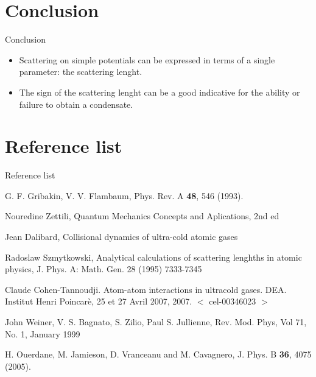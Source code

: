 \section{Conclusion}
\begin{frame}[allowframebreaks]{Conclusion}

\begin{itemize}
\item Scattering on simple potentials can be expressed in terms of a single parameter: the scattering lenght.
\item The sign of the scattering lenght can be a good indicative for the ability or failure to obtain a condensate. 
\end{itemize}

\end{frame}

\section{Reference list}
\begin{frame}[allowframebreaks]{Reference list}
\begin{thebibliography}{1000}
G. F. Gribakin, V. V. Flambaum, Phys. Rev. A {\bf 48}, 546 (1993).

Nouredine Zettili, Quantum Mechanics Concepts and Aplications, 2nd ed

Jean Dalibard, Collisional dynamics of ultra-cold atomic gases

Radoslaw Szmytkowski, Analytical calculations of scattering lenghths in atomic physics, J. Phys. A: Math. Gen. 28 (1995) 7333-7345
  
Claude Cohen-Tannoudji. Atom-atom interactions in ultracold gases. DEA. Institut Henri Poincar\`{e}, 25 et 27 Avril 2007, 2007. $<$ cel-00346023 $>$

John Weiner, V. S. Bagnato, S. Zilio, Paul S. Jullienne, Rev. Mod. Phys, Vol 71, No. 1, January 1999

H. Ouerdane, M. Jamieson, D. Vranceanu and M. Cavagnero, J. Phys. B  {\bf 36}, 4075 (2005).
\end{thebibliography}
\end{frame}


